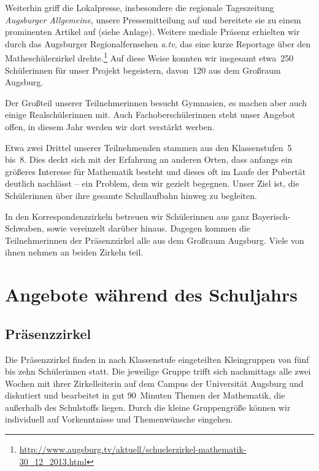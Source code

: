 \documentclass[12pt]{zettel}
\begin{document}
Weiterhin griff die Lokalpresse, insbesondere die regionale Tageszeitung
\emph{Augsburger Allgemeine}, unsere Pressemitteilung auf und bereitete sie zu einem prominenten Artikel auf (siehe Anlage). Weitere mediale Präsenz erhielten wir durch das Augsburger
Regionalfernsehen \emph{a.tv}, das eine kurze Reportage über den Matheschülerzirkel drehte.\footnote{\href{http://www.augsburg.tv/aktuell/schuelerzirkel-mathematik-30_12_2013.html}{\textsf{http:/\!/www.augsburg.tv/aktuell/schuelerzirkel-mathematik-30\_{}12\_{}2013.html}}} Auf diese Weise konnten wir insgesamt etwa~250 Schülerinnen für
unser Projekt begeistern, davon~120 aus dem Großraum Augsburg.

Der Großteil unserer Teilnehmerinnen besucht Gymnasien, es machen aber auch einige Realschülerinnen mit. Auch Fachoberschülerinnen steht unser Angebot offen, in diesem Jahr werden wir dort verstärkt werben.

Etwa zwei Drittel unserer Teilnehmenden
stammen aus den Klassenstufen~5 bis~8.
Dies deckt sich mit der
Erfahrung an anderen Orten, dass anfangs ein größeres Interesse für
Mathematik besteht und dieses oft im Laufe der Pubertät
deutlich nachlässt -- ein Problem, dem wir gezielt begegnen. Unser Ziel ist, die Schülerinnen über ihre gesamte Schullaufbahn hinweg zu begleiten.

In den Korrespondenzzirkeln betreuen wir Schülerinnen aus ganz Bayerisch-Schwaben, sowie vereinzelt darüber hinaus. Dagegen kommen die Teilnehmerinnen
der Prä\-senz\-zir\-kel alle aus dem Großraum Augsburg. Viele von ihnen
nehmen an beiden Zirkeln teil.


\section{Angebote während des Schuljahrs}

\subsection{Präsenzzirkel}

Die Präsenzzirkel finden in nach Klassenstufe eingeteilten
Kleingruppen von fünf bis zehn Schülerinnen statt.
Die jeweilige Gruppe trifft sich nachmittags alle zwei Wochen mit ihrer Zirkelleiterin auf dem Campus der Universität Augsburg und diskutiert und
bearbeitet in gut 90~Minuten Themen der Mathematik, die außerhalb des
Schulstoffs liegen. Durch die kleine Gruppengröße können wir individuell auf
Vorkenntnisse und Themenwünsche eingehen.
\end{document}
